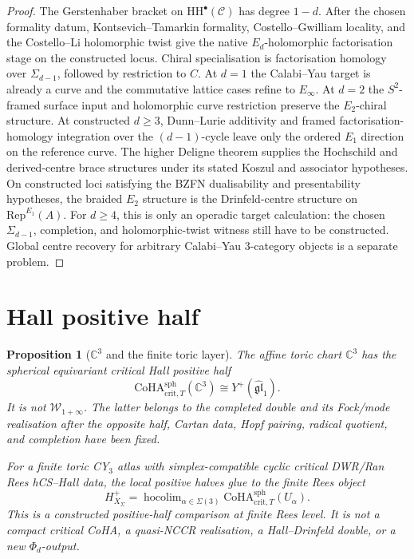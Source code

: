 \documentclass[11pt]{amsart}
\providecommand{\bC}{\mathbb{C}}
\providecommand{\cC}{\mathcal{C}}
\providecommand{\CoHA}{\mathrm{CoHA}}
\providecommand{\Rep}{\mathrm{Rep}}
\providecommand{\HH}{\mathrm{HH}}
\newtheorem{proposition}[theorem]{Proposition}
\theoremstyle{definition}
\theoremstyle{remark}
\begin{document}
\begin{proof}
The Gerstenhaber bracket on \(\HH^\bullet(\cC)\) has degree \(1-d\).
After the chosen formality datum, Kontsevich--Tamarkin formality,
Costello--Gwilliam locality, and the Costello--Li holomorphic twist give
the native \(E_d\)-holomorphic factorisation stage on the constructed
locus. Chiral specialisation is factorisation homology over
\(\Sigma_{d-1}\), followed by restriction to \(C\). At \(d=1\) the
Calabi--Yau target is already a curve and the commutative lattice cases
refine to \(E_\infty\). At \(d=2\) the \(S^2\)-framed surface input and
holomorphic curve restriction preserve the \(E_2\)-chiral structure. At
constructed \(d\geq3\), Dunn--Lurie additivity and framed
factorisation-homology integration over the \((d-1)\)-cycle leave only the
ordered \(E_1\) direction on the reference curve. The higher Deligne
theorem supplies the Hochschild and derived-centre brace structures under
its stated Koszul and associator hypotheses. On constructed loci satisfying
the BZFN dualisability and presentability hypotheses, the braided \(E_2\)
structure is the Drinfeld-centre structure on \(\Rep^{E_1}(A)\). For
\(d\geq4\), this is only an operadic target calculation: the chosen
\(\Sigma_{d-1}\), completion, and holomorphic-twist witness still have to
be constructed. Global centre recovery for arbitrary Calabi--Yau
\(3\)-category objects is a separate problem.
\end{proof}

\section{Hall positive half}

\begin{proposition}[\(\bC^3\) and the finite toric layer]
The affine toric chart \(\bC^3\) has the spherical equivariant critical
Hall positive half
\[
        \CoHA^{\mathrm{sph}}_{\mathrm{crit},T}(\bC^3)
        \cong
        Y^+(\widehat{\mathfrak{gl}}_1).
\]
It is not \(\mathcal W_{1+\infty}\). The latter belongs to the completed
double and its Fock/mode realisation after the opposite half, Cartan data,
Hopf pairing, radical quotient, and completion have been fixed.

For a finite toric CY$_3$ atlas with simplex-compatible cyclic critical
DWR/Ran Rees hCS--Hall data, the local positive halves glue to the finite
Rees object
\[
        H^+_{X_\Sigma}
        =
        \operatorname{hocolim}_{\alpha\in\Sigma(3)}
        \CoHA^{\mathrm{sph}}_{\mathrm{crit},T}(U_\alpha).
\]
This is a constructed positive-half comparison at finite Rees level. It
is not a compact critical CoHA, a quasi-NCCR realisation, a
Hall--Drinfeld double, or a new \(\Phi_d\)-output.
\end{proposition}
\end{document}
